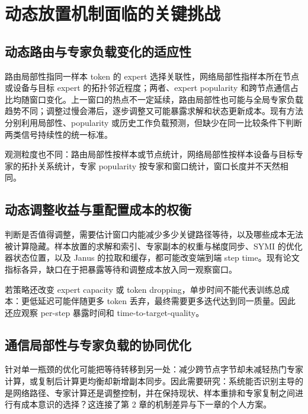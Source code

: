 \section{动态放置机制面临的关键挑战}
\label{sec:challenges}

\subsection{动态路由与专家负载变化的适应性}

路由局部性指同一样本 token 的 expert 选择关联性，网络局部性指样本所在节点或设备与目标 expert 的拓扑邻近程度；两者、expert popularity 和跨节点通信占比均随窗口变化。上一窗口的热点不一定延续，路由局部性也可能与全局专家负载趋势不同；调整过慢会滞后，逐步调整又可能暴露求解和状态更新成本。现有方法分别利用局部性、popularity 或历史工作负载预测，但缺少在同一比较条件下判断两类信号持续性的统一标准。

观测粒度也不同：路由局部性按样本或节点统计，网络局部性按样本设备与目标专家的拓扑关系统计，专家 popularity 按专家和窗口统计，窗口长度并不天然相同。

\subsection{动态调整收益与重配置成本的权衡}

判断是否值得调整，需要估计窗口内能减少多少关键路径等待，以及哪些成本无法被计算隐藏。样本放置的求解和索引、专家副本的权重与梯度同步、SYMI 的优化器状态位置，以及 Janus 的拉取和缓存，都可能改变端到端 step time。现有论文指标各异，缺口在于把暴露等待和调整成本放入同一观察窗口。

若策略还改变 expert capacity 或 token dropping，单步时间不能代表训练总成本：更低延迟可能伴随更多 token 丢弃，最终需要更多迭代达到同一质量。因此还应观察 per-step 暴露时间和 time-to-target-quality。

\subsection{通信局部性与专家负载的协同优化}

针对单一瓶颈的优化可能把等待转移到另一处：减少跨节点字节却未减轻热门专家计算，或复制后计算更均衡却新增副本同步。因此需要研究：系统能否识别主导的是网络路径、专家计算还是调整控制，并在保持现状、样本重排和专家复制之间进行有成本意识的选择？这连接了第 2 章的机制差异与下一章的个人方案。

